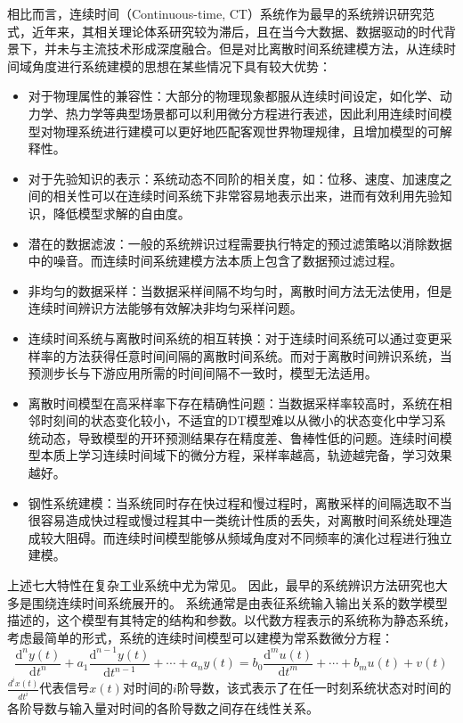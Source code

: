 相比而言，连续时间（Continuous-time, CT）系统作为最早的系统辨识研究范式，近年来，其相关理论体系研究较为滞后，且在当今大数据、数据驱动的时代背景下，并未与主流技术形成深度融合。但是对比离散时间系统建模方法，从连续时间域角度进行系统建模的思想在某些情况下具有较大优势：
\begin{itemize}
\item	对于物理属性的兼容性：大部分的物理现象都服从连续时间设定，如化学、动力学、热力学等典型场景都可以利用微分方程进行表述，因此利用连续时间模型对物理系统进行建模可以更好地匹配客观世界物理规律，且增加模型的可解释性。
\item	对于先验知识的表示：系统动态不同阶的相关度，如：位移、速度、加速度之间的相关性可以在连续时间系统下非常容易地表示出来，进而有效利用先验知识，降低模型求解的自由度。
\item 潜在的数据滤波：一般的系统辨识过程需要执行特定的预过滤策略以消除数据中的噪音。而连续时间系统建模方法本质上包含了数据预过滤过程。
\item	非均匀的数据采样：当数据采样间隔不均匀时，离散时间方法无法使用，但是连续时间辨识方法能够有效解决非均匀采样问题。
\item	连续时间系统与离散时间系统的相互转换：对于连续时间系统可以通过变更采样率的方法获得任意时间间隔的离散时间系统。而对于离散时间辨识系统，当预测步长与下游应用所需的时间间隔不一致时，模型无法适用。
\item	离散时间模型在高采样率下存在精确性问题：当数据采样率较高时，系统在相邻时刻间的状态变化较小，不适宜的DT模型难以从微小的状态变化中学习系统动态，导致模型的开环预测结果存在精度差、鲁棒性低的问题。连续时间模型本质上学习连续时间域下的微分方程，采样率越高，轨迹越完备，学习效果越好。
\item	钢性系统建模：当系统同时存在快过程和慢过程时，离散采样的间隔选取不当很容易造成快过程或慢过程其中一类统计性质的丢失，对离散时间系统处理造成较大阻碍。而连续时间模型能够从频域角度对不同频率的演化过程进行独立建模。
\end{itemize}
上述七大特性在复杂工业系统中尤为常见。
因此，最早的系统辨识方法研究也大多是围绕连续时间系统展开的。
系统通常是由表征系统输入输出关系的数学模型描述的，这个模型有其特定的结构和参数。以代数方程表示的系统称为静态系统，
考虑最简单的形式，系统的连续时间模型可以建模为常系数微分方程：
\begin{equation}
\frac{\mathrm{d}^{n} y(t)}{\mathrm{d} t^{n}}+a_{1} \frac{\mathrm{d}^{n-1} y(t)}{\mathrm{d} t^{n-1}}+\cdots+a_{n} y(t)=b_{0} \frac{\mathrm{d}^{m} u(t)}{\mathrm{d} t^{m}}+\cdots+b_{m} u(t)+v(t)
\label{equ:linear_ct_dyn}
\end{equation}
$\frac{d^{i} x(t)}{d t^{i}}$代表信号$x(t)$对时间的$i$阶导数，该式表示了在任一时刻系统状态对时间的各阶导数与输入量对时间的各阶导数之间存在线性关系。

